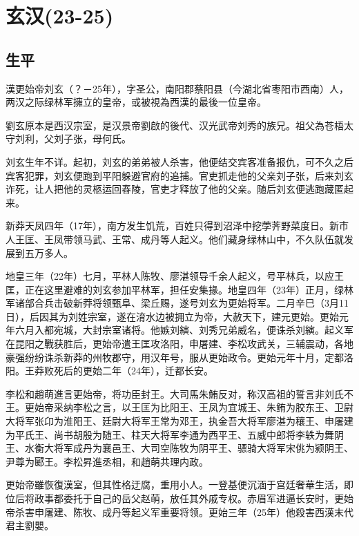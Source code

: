 
\section{玄汉\tiny(23-25)}

\subsection{生平}

漢更始帝刘玄（？－25年），字圣公，南阳郡蔡阳县（今湖北省枣阳市西南）人，两汉之际绿林军擁立的皇帝，或被視為西漢的最後一位皇帝。

劉玄原本是西汉宗室，是汉景帝劉啟的後代、汉光武帝刘秀的族兄。祖父為苍梧太守刘利，父刘子张，母何氏。

刘玄生年不详。起初，刘玄的弟弟被人杀害，他便结交宾客准备报仇，可不久之后宾客犯罪，刘玄便跑到平阳躲避官府的追捕。官吏抓走他的父亲刘子张，后来刘玄诈死，让人把他的灵柩运回舂陵，官吏才释放了他的父亲。随后刘玄便逃跑藏匿起来。

新莽天凤四年（17年），南方发生饥荒，百姓只得到沼泽中挖荸荠野菜度日。新市人王匡、王凤带领马武、王常、成丹等人起义。他们藏身绿林山中，不久队伍就发展到五万多人。

地皇三年（22年）七月，平林人陈牧、廖湛领导千余人起义，号平林兵，以应王匡，正在这里避难的刘玄参加平林军，担任安集掾。地皇四年（23年）正月，绿林军诸部合兵击破新莽将领甄阜、梁丘赐，遂号刘玄为更始将军。二月辛巳（3月11日），后因其为刘姓宗室，遂在淯水边被拥立为帝，大赦天下，建元更始。更始元年六月入都宛城，大封宗室诸将。他嫉刘縯、刘秀兄弟威名，便诛杀刘縯。起义军在昆阳之戰获胜后，更始帝遣王匡攻洛阳，申屠建、李松攻武关，三辅震动，各地豪强纷纷诛杀新莽的州牧郡守，用汉年号，服从更始政令。更始元年十月，定都洛阳。王莽败死后的更始二年（24年），迁都长安。

李松和趙萌進言更始帝，将功臣封王。大司馬朱鮪反对，称汉高祖的誓言非刘氏不王。更始帝采纳李松之言，以王匡为比阳王、王凤为宜城王、朱鲔为胶东王、卫尉大将军张卬为淮阳王、廷尉大将军王常为邓王，执金吾大将军廖湛为穰王、申屠建为平氏王、尚书胡殷为随王、柱天大将军李通为西平王、五威中郎将李轶为舞阴王、水衡大将军成丹为襄邑王、大司空陈牧为阴平王、骠骑大将军宋佻为颍阴王、尹尊为郾王。李松昇進丞相，和趙萌共理内政。

更始帝雖恢復漢室，但其性格迂腐，重用小人。一登基便沉湎于宫廷奢華生活，即位后将政事都委托于自己的岳父赵萌，放任其外戚专权。赤眉军进逼长安时，更始帝杀害申屠建、陈牧、成丹等起义军重要将领。更始三年（25年）他殺害西漢末代君主劉嬰。

